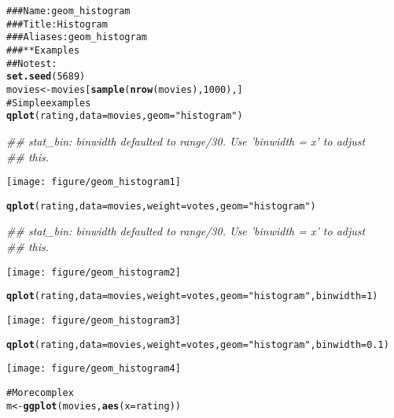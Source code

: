 \documentclass[a4paper,titlepage]{tufte-handout}\usepackage{graphicx, color}
\makeatletter
\def\maxwidth{ %
  \ifdim\Gin@nat@width>\linewidth
    \linewidth
  \else
    \Gin@nat@width
  \fi
}
\newcommand{\hlfunctioncall}[1]{\textcolor[rgb]{0.501960784313725,0,0.329411764705882}{\textbf{#1}}}%
\newcommand{\hlstring}[1]{\textcolor[rgb]{0.6,0.6,1}{#1}}%
\newcommand{\hlcomment}[1]{\textcolor[rgb]{0.180392156862745,0.6,0.341176470588235}{#1}}%
\newenvironment{kframe}{%
 \def\at@end@of@kframe{}%
 \ifinner\ifhmode%
  \def\at@end@of@kframe{\end{minipage}}%
  \begin{minipage}{\columnwidth}%
 \fi\fi%
 \def\FrameCommand##1{\hskip\@totalleftmargin \hskip-\fboxsep
 \colorbox{shadecolor}{##1}\hskip-\fboxsep
     \hskip-\linewidth \hskip-\@totalleftmargin \hskip\columnwidth}%
 \MakeFramed {\advance\hsize-\width
   \@totalleftmargin\z@ \linewidth\hsize
   \@setminipage}}%
 {\par\unskip\endMakeFramed%
 \at@end@of@kframe}
\newenvironment{knitrout}{}{} %
\makeatother
\begin{document}
\begin{knitrout}
\color{fgcolor}\begin{kframe}
\begin{alltt}
\hlcomment{### Name: geom_histogram}
\hlcomment{### Title: Histogram}
\hlcomment{### Aliases: geom_histogram}
\hlcomment{### ** Examples}
\hlcomment{## No test: }
\hlfunctioncall{set.seed}(5689)
movies <- movies[\hlfunctioncall{sample}(\hlfunctioncall{nrow}(movies), 1000), ]
\hlcomment{# Simple examples}
\hlfunctioncall{qplot}(rating, data=movies, geom=\hlstring{"histogram"})
\end{alltt}
\begin{flushleft}\ttfamily\noindent\itshape\textcolor{messagecolor}{\#\# stat\_bin: binwidth defaulted to range/30. Use 'binwidth = x' to adjust \\ 
\#\# this.}\end{flushleft}\end{kframe}\texttt{[image: figure/geom\_histogram1]} \begin{kframe}\begin{alltt}
\hlfunctioncall{qplot}(rating, data=movies, weight=votes, geom=\hlstring{"histogram"})
\end{alltt}
\begin{flushleft}\ttfamily\noindent\itshape\textcolor{messagecolor}{\#\# stat\_bin: binwidth defaulted to range/30. Use 'binwidth = x' to adjust \\ 
\#\# this.}\end{flushleft}\end{kframe}\texttt{[image: figure/geom\_histogram2]} \begin{kframe}\begin{alltt}
\hlfunctioncall{qplot}(rating, data=movies, weight=votes, geom=\hlstring{"histogram"}, binwidth=1)
\end{alltt}
\end{kframe}\texttt{[image: figure/geom\_histogram3]} \begin{kframe}\begin{alltt}
\hlfunctioncall{qplot}(rating, data=movies, weight=votes, geom=\hlstring{"histogram"}, binwidth=0.1)
\end{alltt}
\end{kframe}\texttt{[image: figure/geom\_histogram4]} \begin{kframe}\begin{alltt}
\hlcomment{# More complex}
m <- \hlfunctioncall{ggplot}(movies, \hlfunctioncall{aes}(x=rating))

\end{alltt}
\end{kframe}
\end{knitrout}
\end{document}
